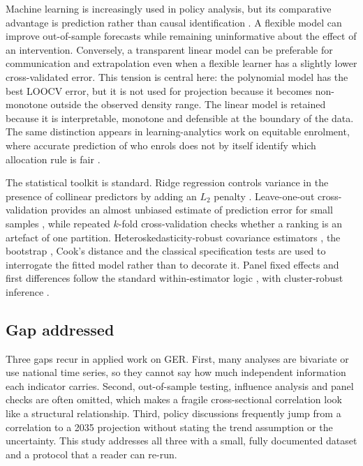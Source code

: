 Machine learning is increasingly used in policy analysis, but its comparative advantage is prediction rather than causal identification \cite{mullainathan2017,athey2019}. A flexible model can improve out-of-sample forecasts while remaining uninformative about the effect of an intervention. Conversely, a transparent linear model can be preferable for communication and extrapolation even when a flexible learner has a slightly lower cross-validated error. This tension is central here: the polynomial model has the best LOOCV error, but it is not used for projection because it becomes non-monotone outside the observed density range. The linear model is retained because it is interpretable, monotone and defensible at the boundary of the data. The same distinction appears in learning-analytics work on equitable enrolment, where accurate prediction of who enrols does not by itself identify which allocation rule is fair \cite{alenezi2026}.

The statistical toolkit is standard. Ridge regression controls variance in the presence of collinear predictors by adding an $L_2$ penalty \cite{hoerl1970}. Leave-one-out cross-validation provides an almost unbiased estimate of prediction error for small samples \cite{stone1974}, while repeated $k$-fold cross-validation checks whether a ranking is an artefact of one partition. Heteroskedasticity-robust covariance estimators \cite{white1980,mackinnon1985}, the bootstrap \cite{efron1993}, Cook's distance \cite{cook1977} and the classical specification tests \cite{shapiro1965,breusch1979,ramsey1969} are used to interrogate the fitted model rather than to decorate it. Panel fixed effects and first differences follow the standard within-estimator logic \cite{angrist2009}, with cluster-robust inference \cite{cameron2015}.

\subsection{Gap addressed}

Three gaps recur in applied work on GER. First, many analyses are bivariate or use national time series, so they cannot say how much independent information each indicator carries. Second, out-of-sample testing, influence analysis and panel checks are often omitted, which makes a fragile cross-sectional correlation look like a structural relationship. Third, policy discussions frequently jump from a correlation to a 2035 projection without stating the trend assumption or the uncertainty. This study addresses all three with a small, fully documented dataset and a protocol that a reader can re-run.
